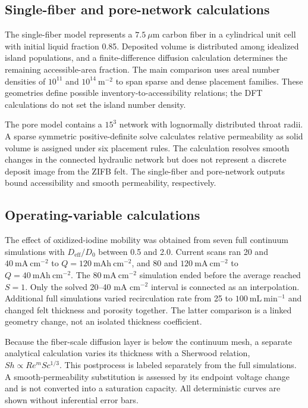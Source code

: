 \documentclass[11pt]{article}
\begin{document}
\subsection{Single-fiber and pore-network calculations}


The single-fiber model represents a $7.5~\mu\mathrm{m}$ carbon fiber in a cylindrical unit cell with initial liquid fraction 0.85. Deposited volume is distributed among idealized island populations, and a finite-difference diffusion calculation determines the remaining accessible-area fraction. The main comparison uses areal number densities of $10^{11}$ and $10^{14}~\mathrm{m^{-2}}$ to span sparse and dense placement families. These geometries define possible inventory-to-accessibility relations; the DFT calculations do not set the island number density.

The pore model contains a $15^3$ network with lognormally distributed throat radii. A sparse symmetric positive-definite solve calculates relative permeability as solid volume is assigned under six placement rules. The calculation resolves smooth changes in the connected hydraulic network but does not represent a discrete deposit image from the ZIFB felt. The single-fiber and pore-network outputs bound accessibility and smooth permeability, respectively.

\subsection{Operating-variable calculations}


The effect of oxidized-iodine mobility was obtained from seven full continuum simulations with $D_{\mathrm{eff}}/D_0$ between 0.5 and 2.0. Current scans ran 20 and $40~\mathrm{mA~cm^{-2}}$ to $Q=120~\mathrm{mAh~cm^{-2}}$, and 80 and $120~\mathrm{mA~cm^{-2}}$ to $Q=40~\mathrm{mAh~cm^{-2}}$. The $80~\mathrm{mA~cm^{-2}}$ simulation ended before the average reached $S=1$. Only the solved 20--40 mA cm$^{-2}$ interval is connected as an interpolation. Additional full simulations varied recirculation rate from 25 to $100~\mathrm{mL~min^{-1}}$ and changed felt thickness and porosity together. The latter comparison is a linked geometry change, not an isolated thickness coefficient.

Because the fiber-scale diffusion layer is below the continuum mesh, a separate analytical calculation varies its thickness with a Sherwood relation, $Sh\propto Re^mSc^{1/3}$. This postprocess is labeled separately from the full simulations. A smooth-permeability substitution is assessed by its endpoint voltage change and is not converted into a saturation capacity. All deterministic curves are shown without inferential error bars.
\end{document}
